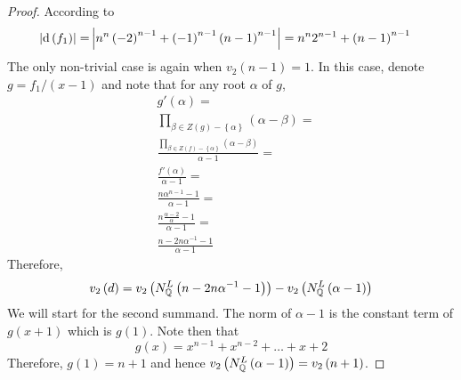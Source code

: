 \documentclass[../main.tex]{subfiles}
\begin{document}
\begin{proof}
  According to \cite[Theorem 2]{Swan62} 
  \begin{align*}
    \left| \operatorname{\rm d}\left( f_1 \right) \right| = &
    \left|  
      n^n \left( -2 \right)^{n-1} + \left( -1 \right)^{n-1} \left( n-1 \right)^{n-1}
    \right| = n^n 2^{n-1} + \left( n-1 \right)^{n-1}
  \end{align*}
  The only non-trivial case is again when $v_2\left( n-1 \right) = 1$.
  In this case, denote $g = f_1 / \left( x - 1 \right)$ and note that for any root $\alpha$ of $g$, 
  \begin{align*}
    & g'\left( \alpha \right) = \\
    & \prod_{\beta \in Z\left( g \right) - \left\{ \alpha \right\}}\left( \alpha - \beta \right) = \\
    & \frac{
      \prod_{\beta \in Z\left( f \right) - \left\{ \alpha \right\}}\left( \alpha - \beta \right)
    }{
      \alpha - 1
    } = \\
    & \frac{
      f'\left( \alpha \right)
    }{
      \alpha - 1
    } = \\
    & \frac{
      n \alpha^{n-1} - 1
    }{
      \alpha - 1
    } = \\
    & \frac{
      n \frac{\alpha - 2}{\alpha} - 1
    }{
      \alpha - 1
    } = \\
    & \frac{
      n - 2n\alpha^{-1} - 1
    }{
      \alpha - 1
    }
  \end{align*}
  Therefore, 
  \[
    v_2\left( d \right) = 
    v_2\left( N^L_{\mathbb{Q}}\left( n - 2n\alpha^{-1} - 1\right) \right) - 
    v_2\left( N^L_{\mathbb{Q}}\left( \alpha - 1 \right) \right) 
  \]
  We will start for the second summand.
  The norm of $\alpha - 1$ is the constant term of $g\left( x + 1 \right)$ which is $g\left( 1 \right)$.
  Note then that 
  \[
    g\left( x \right) = x^{n-1} + x^{n-2} + \ldots + x + 2
  \]
  Therefore, $g\left( 1 \right) = n + 1$ and hence $v_2\left( N^L_{\mathbb{Q}}\left( \alpha - 1 \right) \right) = v_2\left( n + 1 \right)$.
  

\end{proof}
\end{document}
